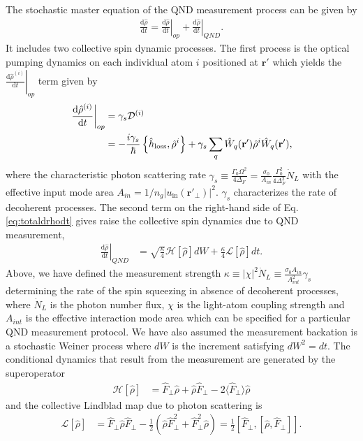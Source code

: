 \documentclass[preprint,aps,pra,onecolumn,superscriptaddress]{revtex4-1} %
\newcommand{\dt}[1]{\frac{{\mathrm d} {#1}}{{\mathrm d}t}}
\def\br{\mathbf{r}}
\newcommand{\expect}[1]{\big\langle #1 \big\rangle}
\begin{document}
The stochastic master equation of the QND measurement process can be given by
\begin{align}\label{eq:totaldrhodt}
\dt{\hat{\rho}}=\left.\dt{\hat{\rho}}\right|_{op} + \left.\dt{\hat{\rho}}\right|_{QND}.
\end{align}
It includes two collective spin dynamic processes. 
The first process is the optical pumping dynamics on each individual atom $i$ positioned at $\br'$ which yields the $ \left.\dt{\hat{\rho}^{(i)}}\right|_{op} $ term given by
\begin{align}
\left.\dt{\hat{\rho}^{(i)}}\right|_{op} &=\gamma_s\mathcal{D}^{(i)}\\
&= -\frac{i\gamma_s}{\hbar} \left\{\hat{h}_{\rm loss},\hat{\rho}^{i} \right\} + \gamma_s\sum_q \hat{W}_q(\br')\hat{\rho}^{i}\hat{W}_q(\br'),
\end{align}
where the characteristic photon scattering rate $ \gamma_s\equiv \frac{\Gamma_0\Omega^2}{4\Delta_F}=\frac{\sigma_0}{A_{in}}\frac{\Gamma_0^2}{4\Delta_F^2}\dot{N}_L $ with the effective input mode area $ A_{in}=1/n_g|u_{\mathrm{in}}(\br'\!_\perp)|^2 $.
$\gamma_s$ characterizes the rate of decoherent processes.
The second term on the right-hand side of Eq.\eqref{eq:totaldrhodt} gives raise the collective spin dynamics due to QND measurement,
\begin{align}
\left.\dt{\hat{\rho}}\right|_{QND} &= \sqrt{\frac{\kappa}{4}}\mathcal{H}\left[\hat{\rho} \right]dW + \frac{\kappa}{4}\mathcal{L}\left[ \hat{\rho}\right]dt.
\end{align}
Above, we have defined the measurement strength $\kappa \equiv |\chi|^2\dot{N}_L\equiv \frac{\sigma_0A_{in}}{A_{int}^2}\gamma_s $ determining the rate of the spin squeezing in absence of decoherent processes, where $\dot{N}_L$ is the photon number flux, $\chi$ is the light-atom coupling strength and $A_{int}$ is the effective interaction mode area which can be specified for a particular QND measurement protocol. We have also assumed the measurement backation is a stochastic Weiner process where $dW$ is the increment satisfying $dW^2 = dt$. The conditional dynamics that result from the measurement are generated by the superoperator
\begin{align}
\mathcal{H}\left[ \hat{\rho}\right] &= \hat{F}_\perp\hat{\rho} + \hat{\rho}\hat{F}_\perp -2\expect{\hat{F}_\perp}\hat{\rho}
\end{align}
and the collective Lindblad map due to photon scattering is
\begin{align}
\mathcal{L}\left[ \hat{\rho} \right] &= \hat{F}_\perp\hat{\rho}\hat{F}_\perp-\frac{1}{2}\left(\hat{\rho}\hat{F}_\perp^2+\hat{F}_\perp^2\hat{\rho} \right)=\frac{1}{2}\left[\hat{F}_\perp,\left[\hat{\rho},\hat{F}_\perp \right] \right].
\end{align}
\end{document}
